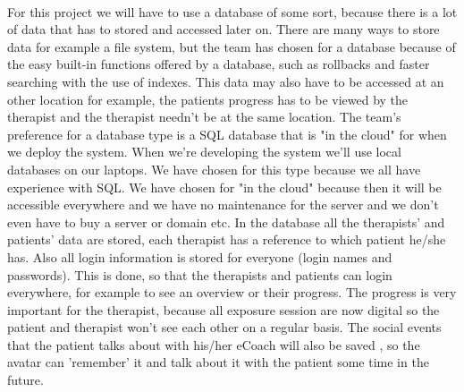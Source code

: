 
\paragraph{}
For this project we will have to use a database of some sort, because there is a lot of data that has to stored and accessed later on. There are many ways to store data for example a file system, but the team has chosen for a database because of the easy built-in functions offered by a database, such as rollbacks and faster searching with the use of indexes.
This data may also have to be accessed at an other location for example, the patients progress has to be viewed by the therapist and the therapist needn't be at the same location. The team's preference for a database type is a SQL database that is "in the cloud" for when we deploy the system. When we're developing the system we'll use local databases on our laptops. 
We have chosen for this type because we all have experience with SQL. We have chosen for "in the cloud" because then it will be accessible everywhere and we have no maintenance for the server and we don't even have to buy a server or domain etc. 
In the database all the therapists' and patients' data are stored, each therapist has a reference to which patient he/she has. Also all login information is stored for everyone (login names and passwords). This is done, so that the therapists and patients can login everywhere, for example to see an overview or their progress. The progress is very important for the therapist, because all exposure session are now digital so the patient and therapist won't see each other on a regular basis.
The social events that the patient talks about with his/her eCoach will also be saved , so the avatar can 'remember' it and talk about it with the patient some time in the future.
